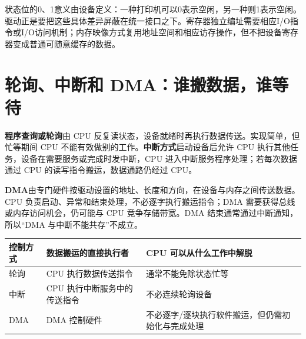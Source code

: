 状态位的0、1意义由设备定义：一种打印机可以0表示空闲，另一种则1表示空闲。驱动正是要把这些具体差异屏蔽在统一接口之下。寄存器独立编址需要相应I/O指令或I/O访问机制；内存映像方式复用地址空间和相应访存操作，但不把设备寄存器变成普通可随意缓存的数据。

\section{轮询、中断和 DMA：谁搬数据，谁等待}\label{OS05-7-2}

\textbf{程序查询或轮询}由 CPU 反复读状态，设备就绪时再执行数据传送。实现简单，但忙等期间 CPU 不能有效做别的工作。\textbf{中断方式}启动设备后允许 CPU 执行其他任务，设备在需要服务或完成时发中断，CPU 进入中断服务程序处理；若每次数据通过 CPU 的读写指令搬运，数据通路仍经过 CPU。

\textbf{DMA}由专门硬件按驱动设置的地址、长度和方向，在设备与内存之间传送数据。CPU 负责启动、异常和结束处理，不必逐字执行搬运指令；DMA 需要获得总线或内存访问机会，仍可能与 CPU 竞争存储带宽。DMA 结束通常通过中断通知，所以``DMA 与中断不能共存''不成立。

\begin{wideblock}

\par\medskip\noindent\begin{minipage}{\linewidth}\fontsize{9.3}{12}\selectfont\begin{tabularx}{\linewidth}{@{}YYY@{}}
\toprule\noalign{}
\begin{minipage}[b]{\linewidth}\raggedright
控制方式
\end{minipage} & \begin{minipage}[b]{\linewidth}\raggedright
数据搬运的直接执行者
\end{minipage} & \begin{minipage}[b]{\linewidth}\raggedright
CPU 可以从什么工作中解脱
\end{minipage} \\
\midrule\noalign{}


轮询 & CPU 执行数据传送指令 & 通常不能免除状态忙等 \\
中断 & CPU 执行中断服务中的传送指令 & 不必连续轮询设备 \\
DMA & DMA 控制硬件 & 不必逐字/逐块执行软件搬运，但仍需初始化与完成处理 \\
\bottomrule\end{tabularx}
\end{minipage}\par\medskip

\end{wideblock}

